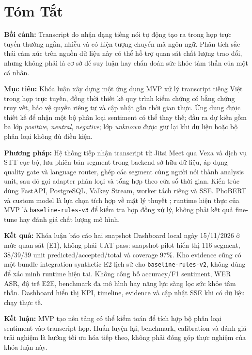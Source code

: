 \chapter*{Tóm Tắt}

\textbf{Bối cảnh:} Transcript do nhận dạng tiếng nói tự động tạo ra trong họp trực tuyến thường ngắn, nhiễu và có hiện tượng chuyển mã ngôn ngữ. Phân tích sắc thái cảm xúc trên nguồn dữ liệu này có thể hỗ trợ quan sát chất lượng trao đổi, nhưng không phải là cơ sở để suy luận hay chẩn đoán sức khỏe tâm thần của một cá nhân.

\textbf{Mục tiêu:} Khóa luận xây dựng một ứng dụng MVP xử lý transcript tiếng Việt trong họp trực tuyến, đồng thời thiết kế quy trình kiểm chứng có bằng chứng truy vết, bảo vệ quyền riêng tư và cập nhật gần thời gian thực. Ứng dụng được thiết kế để nhận một bộ phân loại sentiment có thể thay thế; đầu ra dự kiến gồm ba lớp \textit{positive}, \textit{neutral}, \textit{negative}; lớp \textit{unknown} được giữ lại khi dữ liệu hoặc bộ phân loại không đủ điều kiện.

\textbf{Phương pháp:} Hệ thống tiếp nhận transcript từ Jitsi Meet qua Vexa và dịch vụ STT cục bộ, lưu phiên bản segment trong backend sở hữu dữ liệu, áp dụng quality gate và language router, ghép các segment cùng người nói thành analysis unit, sau đó gọi adapter phân loại và tổng hợp theo cửa sổ thời gian. Kiến trúc dùng FastAPI, PostgreSQL, Valkey Stream, worker tách riêng và SSE. PhoBERT và custom model là lựa chọn tích hợp về mặt lý thuyết \cite{phobert2020}; runtime hiện thực của MVP là \texttt{baseline-rules-v3} để kiểm tra hợp đồng xử lý, không phải kết quả fine-tune hay đánh giá chất lượng mô hình.

\textbf{Kết quả:} Khóa luận báo cáo hai snapshot Dashboard local ngày 15/11/2026 ở mức quan sát (E1), không phải UAT pass: snapshot pilot hiển thị 116 segment, 38/39/39 unit predicted/accepted/total và coverage 97\%. Kho evidence cũng có một bundle integration synthetic E2 lịch sử cho \texttt{baseline-rules-v2}, không dùng để xác minh runtime hiện tại. Không công bố accuracy/F1 sentiment, WER ASR, độ trễ E2E, benchmark đa mô hình hay năng lực sàng lọc sức khỏe tâm thần. Dashboard hiển thị KPI, timeline, evidence và cập nhật SSE khi có dữ liệu chạy thực tế.

\textbf{Kết luận:} MVP tạo nền tảng có thể kiểm toán để tích hợp bộ phân loại sentiment vào transcript họp. Huấn luyện lại, benchmark, calibration và đánh giá trải nghiệm là hướng tối ưu hóa tiếp theo, không phải đóng góp thực nghiệm của khóa luận này.


